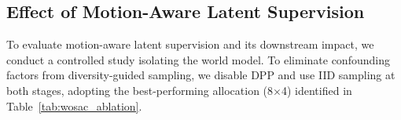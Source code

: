 \documentclass[runningheads]{llncs}
\begin{document}
\begin{table}[t]
\centering
\caption{Effect of motion-aware latent supervision on world modeling and downstream traffic simulation. By focusing on dynamic occupancy transitions, the world-model quality and traffic simulation performance improve without requiring semantic labels.}
\vspace{-2mm}
\label{tab:latent_supervision}
 \vspace{-5mm}
\end{table}




\vspace{-2.2mm}
\subsection{Effect of Motion-Aware Latent Supervision}

To evaluate motion-aware latent supervision and its downstream impact, we conduct a controlled study isolating the world model. To eliminate confounding factors from diversity-guided sampling, we disable DPP and use IID sampling at both stages, adopting the best-performing allocation (8×4) identified in Table~\ref{tab:wosac_ablation}.
\end{document}
